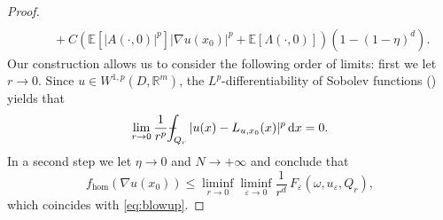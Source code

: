 \documentclass[10pt]{amsart}
\theoremstyle{definition}
\def\Xint#1{\mathchoice
{\XXint\displaystyle\textstyle{#1}}%
{\XXint\textstyle\scriptstyle{#1}}%
{\XXint\scriptstyle\scriptscriptstyle{#1}}%
{\XXint\scriptscriptstyle\scriptscriptstyle{#1}}%
\!\int}
\def\XXint#1#2#3{{\setbox0=\hbox{$#1{#2#3}{\int}$ }
\vcenter{\hbox{$#2#3$ }}\kern-.57\wd0}}
\def\dashint{\Xint-}
\let\e\varepsilon
\let\w\omega
\newcommand{\dx}{\,\mathrm{d}x}
\newcommand{\R}{\mathbb{R}}
\begin{document}
\begin{proof}
\begin{align*}
\\
&\quad+C\left(\mathbb{E}[|A(\cdot,0)|^p]|\nabla u(x_0)|^p+\mathbb{E}[\Lambda(\cdot,0)]\right)(1-(1-\eta)^d).
\end{align*}
Our construction allows us to consider the following order of limits: first we let $r\to 0$. Since $u\in W^{1,p}(D,\R^m)$, the $L^p$-differentiability of Sobolev functions (\cf \cite[Th.\,2, p.\,230]{EvGa}) yields that
\begin{equation*}
\lim_{r\to 0}\frac{1}{r^p}\dashint_{Q_r}|u(x)-L_{u,x_0}(x)|^p\dx=0.
\end{equation*}
In a second step we let $\eta\to 0$ and $N\to +\infty$ and conclude that
\begin{equation*}
f_{\hom}(\nabla u(x_0))\leq \liminf_{r\to 0}\liminf_{\e\to 0}\frac{1}{r^d}\,F_{\e}(\w,u_{\e},Q_r),
\end{equation*}
which coincides with \eqref{eq:blowup}.


\end{proof}
\end{document}

